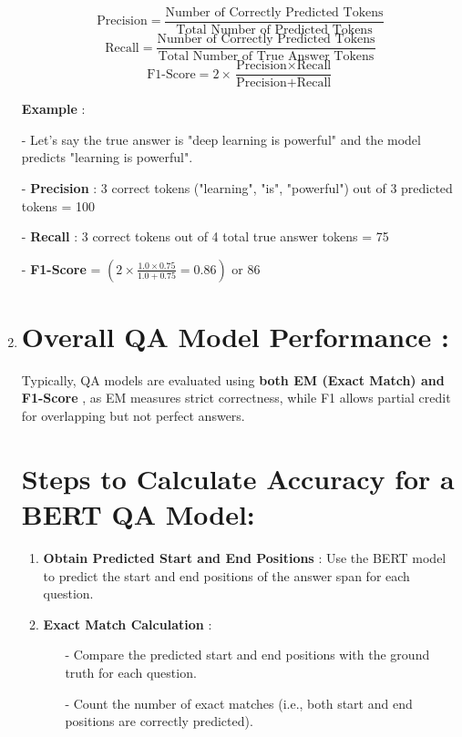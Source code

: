 \documentclass[10pt]{article}
\begin{document}
\begin{enumerate}
      $$
      \text{Precision} = \frac{\text{Number of Correctly Predicted Tokens}}{\text{Total Number of Predicted Tokens}}
      $$
      $$
      \text{Recall} = \frac{\text{Number of Correctly Predicted Tokens}}{\text{Total Number of True Answer Tokens}}
      $$
      $$
      \text{F1-Score} = 2 \times \frac{\text{Precision} \times \text{Recall}}{\text{Precision} + \text{Recall}}
      $$

      { \bf Example }:

      - Let’s say the true answer is "deep learning is powerful" and the model predicts "learning is powerful".

      - { \bf Precision }: 3 correct tokens ("learning", "is", "powerful") out of 3 predicted tokens = 100%

      - { \bf Recall }: 3 correct tokens out of 4 total true answer tokens = 75%

      - { \bf F1-Score } = $( 2 \times \frac{1.0 \times 0.75}{1.0 + 0.75} = 0.86 )$ or 86%

   \item
      \section*{{ \bf Overall QA Model Performance }:}
      Typically, QA models are evaluated using { \bf both EM (Exact Match){ \bf  and  }F1-Score }, as EM measures strict correctness, while F1 allows partial credit for overlapping but not perfect answers.

      \section*{ Steps to Calculate Accuracy for a BERT QA Model:}
      \begin{enumerate}
         \item { \bf Obtain Predicted Start and End Positions }: Use the BERT model to predict the start and end positions of the answer span for each question.
         \item { \bf Exact Match Calculation }:
         \begin{itemize}
            \item [-] Compare the predicted start and end positions with the ground truth for each question.
            \item [-] Count the number of exact matches (i.e., both start and end positions are correctly predicted).
         \end{itemize}


\end{enumerate}
\end{enumerate}
\end{document}
